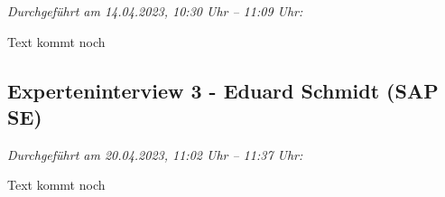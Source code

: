 \textit{Durchgeführt am 14.04.2023, 10:30 Uhr -- 11:09 Uhr:}

Text kommt noch 

\newpage
\subsection{Experteninterview 3 - Eduard Schmidt (SAP SE)}

\textit{Durchgeführt am 20.04.2023, 11:02 Uhr -- 11:37 Uhr:}

Text kommt noch

\newpage


